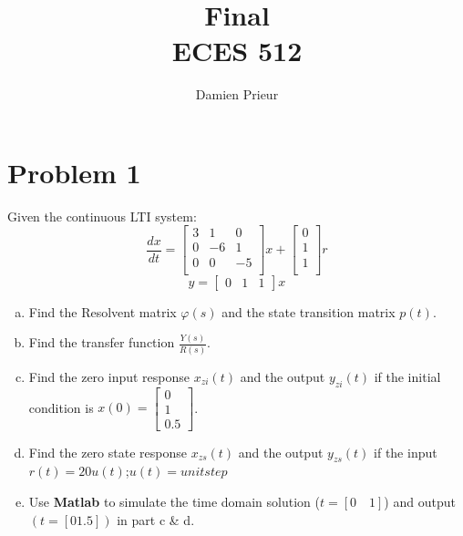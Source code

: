 \documentclass{article}
\author{Damien Prieur}
\title{Final \\ ECES 512}
\date{}
\begin{document}
\maketitle

\section*{Problem 1}
Given the continuous LTI system:
$$
\frac{dx}{dt} =
\begin{bmatrix}
3 & 1 & 0  \\
0 & -6 & 1 \\
0 & 0 & -5 \\
\end{bmatrix}
x +
\begin{bmatrix}
0 \\
1 \\
1 \\
\end{bmatrix}
r
$$
$$
y = \begin{bmatrix} 0 & 1 & 1 \end{bmatrix}x
$$

\begin{enumerate}[a.]
\item Find the Resolvent matrix $\varphi(s)$ and the state transition matrix $p(t)$.
\newline

\item Find the transfer function $\frac{Y(s)}{R(s)}$.
\newline

\item Find the zero input response $x_{zi}(t)$ and the output $y_{zi}(t)$ if the initial condition is $x(0)=\begin{bmatrix} 0 \\ 1 \\ 0.5 \end{bmatrix}$.
\newline

\item Find the zero state response $x_{zs}(t)$ and the output $y_{zs}(t)$ if the input $r(t) = 20u(t)$;$u(t) = unit step$
\newline

\item Use \textbf{Matlab} to simulate the time domain solution ($t=[0 \quad 1]$) and output $(t = [0 1.5])$ in part c \& d.
\newline

\end{enumerate}
\end{document}
